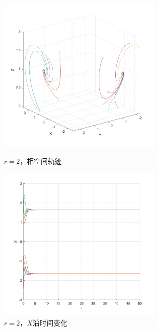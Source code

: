\documentclass[UTF8,zihao=5]{ctexart} %
\begin{document}
\begin{figure}[H]
    \begin{minipage}[c]{0.45\linewidth}  %
        \centering
        \includegraphics[width=8cm]{XYZ_r_2.png}  %
        \caption{$r=2$，相空间轨迹}
    \end{minipage}
    \hfill %
    \begin{minipage}[c]{0.45\linewidth}  %
        \centering
        \includegraphics[width=8cm]{XT_r_2.png}  %
        \caption{$r=2$，$X$沿时间变化}
    \end{minipage}
\end{figure}
\end{document}
